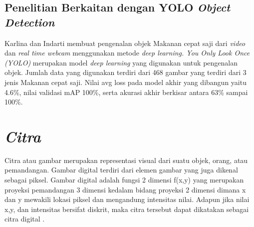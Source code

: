 \subsection{Penelitian Berkaitan dengan YOLO \textit{Object Detection}}
\label{subsec:penelitianterkaityolo}
Karlina dan Indarti \citep*{karlina2020pengenalan} membuat pengenalan objek Makanan cepat saji dari \textit{video} dan \textit{real time webcam} menggunakan metode \textit{deep learning. You Only Look Once (YOLO)} merupakan model \textit{deep learning} yang digunakan untuk pengenalan objek. Jumlah data yang digunakan terdiri dari 468 gambar yang terdiri dari 3 jenis Makanan cepat saji. Nilai avg loss pada model akhir yang dibangun yaitu 4.6\%, nilai validasi mAP 100\%, serta akurasi akhir berkisar antara 63\% sampai 100\%. \par



\section{\textit{Citra}}
\label{sec:citra}

Citra atau gambar merupakan representasi visual dari suatu objek, orang, atau pemandangan. Gambar digital terdiri dari elemen gambar yang juga dikenal sebagai piksel. Gambar digital adalah fungsi 2 dimensi f(x,y) yang merupakan proyeksi pemandangan 3 dimensi kedalam bidang proyeksi 2 dimensi dimana x dan y mewakili lokasi piksel dan mengandung intensitas nilai. Adapun jika nilai x,y, dan intensitas bersifat diskrit, maka citra tersebut dapat dikatakan sebagai citra digital \citep*{tyagi2018understanding}.

